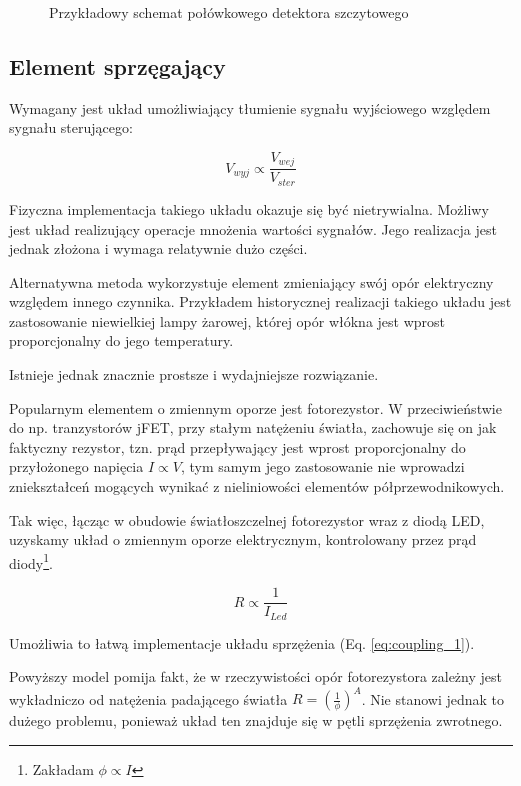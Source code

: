 \documentclass[12pt, a4paper]{article}
\begin{document}
\begin{figure}[h]
	\centering
	
	\caption{Przykładowy schemat połówkowego detektora szczytowego}
	\label{fig:peak-detector-schematic}
\end{figure}

\subsection{Element sprzęgający}
Wymagany jest układ umożliwiający tłumienie sygnału wyjściowego względem sygnału sterującego:

\begin{equation}
	V_{wyj} \propto \frac{V_{wej}}{V_{ster}}
	\label{eq:coupling_1}
\end{equation}

Fizyczna implementacja takiego układu okazuje się być nietrywialna.
Możliwy jest układ realizujący operacje mnożenia wartości sygnałów. 
Jego realizacja jest jednak złożona i wymaga relatywnie dużo części.

Alternatywna metoda wykorzystuje element zmieniający swój opór elektryczny względem innego czynnika.
Przykładem historycznej realizacji takiego układu jest zastosowanie niewielkiej lampy żarowej,
której opór włókna jest wprost proporcjonalny do jego temperatury.

Istnieje jednak znacznie prostsze i wydajniejsze rozwiązanie.

Popularnym elementem o zmiennym oporze jest fotorezystor. W przeciwieństwie do 
np. tranzystorów jFET, przy stałym natężeniu światła, zachowuje się on jak faktyczny rezystor,
tzn. prąd przepływający jest wprost proporcjonalny do przyłożonego napięcia
$I \propto V$, tym samym jego zastosowanie nie wprowadzi zniekształceń mogących wynikać
z nieliniowości elementów półprzewodnikowych.

Tak więc, łącząc w obudowie światłoszczelnej fotorezystor wraz z diodą LED,
uzyskamy układ o zmiennym oporze elektrycznym, kontrolowany przez prąd diody\footnote{Zakładam $\phi \propto I$}.

\begin{equation}
	R \propto \frac{1}{I_{Led}}
\end{equation}

Umożliwia to łatwą implementacje układu sprzężenia (Eq. \ref{eq:coupling_1}). 

Powyższy model pomija fakt, że w rzeczywistości opór fotorezystora zależny jest wykładniczo od natężenia padającego światła
$R = \left(\frac{1}{\phi}\right)^A$. Nie stanowi jednak to dużego problemu, ponieważ układ ten znajduje się w 
pętli sprzężenia zwrotnego.
\end{document}
